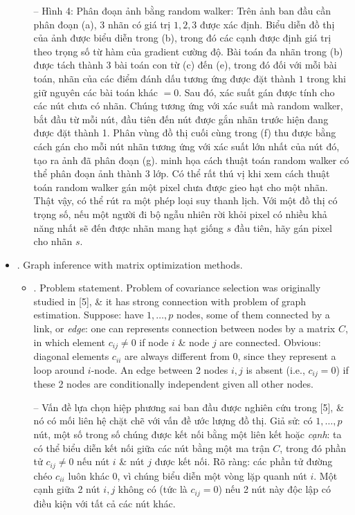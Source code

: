 \documentclass{article}
\begin{document}
\begin{itemize}
\begin{itemize}
        -- {\sf Hình 4: Phân đoạn ảnh bằng random walker: Trên ảnh ban đầu cần phân đoạn (a), 3 nhãn có giá trị $1,2,3$ được xác định. Biểu diễn đồ thị của ảnh được biểu diễn trong (b), trong đó các cạnh được định giá trị theo trọng số từ hàm của gradient cường độ. Bài toán đa nhãn trong (b) được tách thành $3$ bài toán con từ (c) đến (e), trong đó đối với mỗi bài toán, nhãn của các điểm đánh dấu tương ứng được đặt thành $1$ trong khi giữ nguyên các bài toán khác $= 0$. Sau đó, xác suất gán được tính cho các nút chưa có nhãn. Chúng tương ứng với xác suất mà random walker, bắt đầu từ mỗi nút, đầu tiên đến nút được gắn nhãn trước hiện đang được đặt thành 1. Phân vùng đồ thị cuối cùng trong (f) thu được bằng cách gán cho mỗi nút nhãn tương ứng với xác suất lớn nhất của nút đó, tạo ra ảnh đã phân đoạn (g).} minh họa cách thuật toán random walker có thể phân đoạn ảnh thành 3 lớp. Có thể rất thú vị khi xem cách thuật toán random walker gán một pixel chưa được gieo hạt cho một nhãn. Thật vậy, có thể rút ra một phép loại suy thanh lịch. Với một đồ thị có trọng số, nếu một người đi bộ ngẫu nhiên rời khỏi pixel có nhiều khả năng nhất sẽ đến được nhãn mang hạt giống $s$ đầu tiên, hãy gán pixel cho nhãn $s$.
    \end{itemize}
    \item {. Graph inference with matrix optimization methods.}
    \begin{itemize}
        \item {. Problem statement.} Problem of covariance selection was originally studied in [5], \& it has strong connection with problem of graph estimation. Suppose: have $1,\ldots,p$ nodes, some of them connected by a link, or {\it edge}: one can represents connection between nodes by a matrix $C$, in which element $c_{ij}\ne0$ if node $i$ \& node $j$ are connected. Obvious: diagonal elements $c_{ii}$ are always different from 0, since they represent a loop around $i$-node. An edge between 2 nodes $i,j$ is absent (i.e., $c_{ij} = 0$) if these 2 nodes are conditionally independent given all other nodes.
        
        -- Vấn đề lựa chọn hiệp phương sai ban đầu được nghiên cứu trong [5], \& nó có mối liên hệ chặt chẽ với vấn đề ước lượng đồ thị. Giả sử: có $1,\ldots,p$ nút, một số trong số chúng được kết nối bằng một liên kết hoặc {\it cạnh}: ta có thể biểu diễn kết nối giữa các nút bằng một ma trận $C$, trong đó phần tử $c_{ij}\ne0$ nếu nút $i$ \& nút $j$ được kết nối. Rõ ràng: các phần tử đường chéo $c_{ii}$ luôn khác 0, vì chúng biểu diễn một vòng lặp quanh nút $i$. Một cạnh giữa 2 nút $i,j$ không có (tức là $c_{ij} = 0$) nếu 2 nút này độc lập có điều kiện với tất cả các nút khác.
        

\end{itemize}
\end{itemize}
\end{document}
